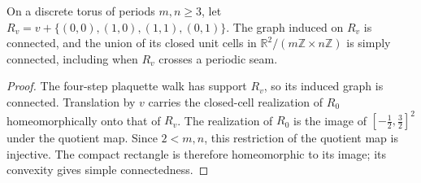\begin{lemma}%
    \label{thm:peps_torus_plaquette_realization}
    \leanok
    On a discrete torus of periods $m,n\ge3$, let
    $R_v=v+\{(0,0),(1,0),(1,1),(0,1)\}$.
    The graph induced on $R_v$ is connected, and the union of its
    closed unit cells in $\mathbb R^2/(m\mathbb Z\times n\mathbb Z)$
    is simply connected, including when $R_v$ crosses a periodic seam.
\end{lemma}
\begin{proof}\leanok
    The four-step plaquette walk has support $R_v$, so its induced graph
    is connected. Translation by $v$ carries the closed-cell realization
    of $R_0$ homeomorphically onto that of $R_v$.
    The realization of $R_0$ is the image of
    $[-\tfrac12,\tfrac32]^2$ under the quotient map.
    Since $2<m,n$, this restriction of the quotient map is injective.
    The compact rectangle is therefore homeomorphic to its image;
    its convexity gives simple connectedness.
\end{proof}

